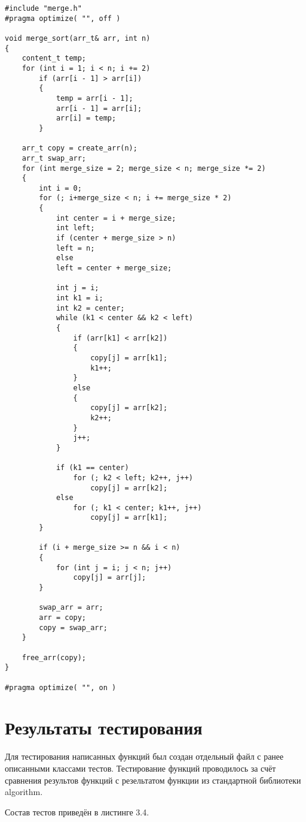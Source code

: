 \begin{lstlisting}[caption = Функция сортировки слиянием.]
#include "merge.h"
#pragma optimize( "", off )

void merge_sort(arr_t& arr, int n)
{
	content_t temp;
	for (int i = 1; i < n; i += 2)
		if (arr[i - 1] > arr[i])
		{
			temp = arr[i - 1];
			arr[i - 1] = arr[i];
			arr[i] = temp;
		}
	
	arr_t copy = create_arr(n);
	arr_t swap_arr;
	for (int merge_size = 2; merge_size < n; merge_size *= 2)
	{
		int i = 0;
		for (; i+merge_size < n; i += merge_size * 2)
		{
			int center = i + merge_size;
			int left;
			if (center + merge_size > n)
			left = n;
			else
			left = center + merge_size;
			
			int j = i;
			int k1 = i;
			int k2 = center;
			while (k1 < center && k2 < left)
			{
				if (arr[k1] < arr[k2])
				{
					copy[j] = arr[k1];
					k1++;
				} 
				else 
				{
					copy[j] = arr[k2];
					k2++;
				}
				j++;
			}
			
			if (k1 == center)
				for (; k2 < left; k2++, j++)
					copy[j] = arr[k2];
			else 
				for (; k1 < center; k1++, j++)
					copy[j] = arr[k1];
		}
		
		if (i + merge_size >= n && i < n)
		{			
			for (int j = i; j < n; j++)
				copy[j] = arr[j];
		}
		
		swap_arr = arr;
		arr = copy;
		copy = swap_arr;
	}
	
	free_arr(copy);
}

#pragma optimize( "", on )

\end{lstlisting}


\section{Результаты тестирования}
Для тестирования написанных функций был создан отдельный файл с ранее описанными классами тестов. Тестирование функций проводилось за счёт сравнения результов функций с резельтатом функции из стандартной библиотеки algorithm.

Состав тестов приведён в листинге 3.4.

